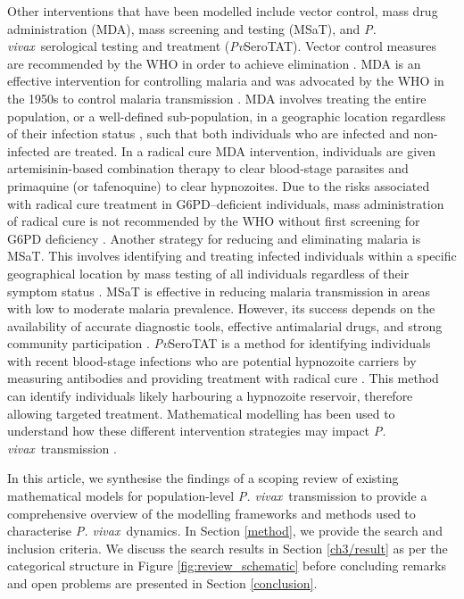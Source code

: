 \documentclass[12pt]{article}
\newcommand{\pv}{\textit{P. vivax}}
\begin{document}
Other interventions that have been modelled include vector control, mass drug administration (MDA), mass screening and testing (MSaT), and \pv~serological testing and treatment (\textit{Pv}SeroTAT). Vector control measures are recommended by the WHO in order to achieve elimination \cite{zuber2018multidrug}.
MDA is an effective intervention for controlling malaria and was advocated by the WHO in the 1950s to control malaria transmission \cite{hsiang2013mass}. MDA involves treating the entire population, or a well-defined sub-population, in a geographic location regardless of their infection status \cite{newby2015review,hsiang2013mass}, such that both individuals who are infected and non-infected are treated. In a radical cure MDA intervention, individuals are given artemisinin-based combination therapy to clear blood-stage parasites and primaquine (or tafenoquine) to clear hypnozoites. Due to the risks associated with radical cure treatment in G6PD–deficient individuals, mass administration of radical cure is not recommended by the WHO without first screening for G6PD deficiency \cite{world2021second,howes2012g6pd, watson2018implications}. Another strategy for reducing and eliminating malaria is MSaT. This involves identifying and treating infected individuals within a specific geographical location by mass testing of all individuals regardless of their symptom status \cite{singh2022mass}. MSaT is effective in reducing malaria transmission in areas with low to moderate malaria prevalence. However, its success depends on the availability of accurate diagnostic tools, effective antimalarial drugs, and strong community participation \cite{world2020world,kim2021systematic}. \textit{Pv}SeroTAT is a method for identifying individuals with recent blood-stage infections who are potential hypnozoite carriers by measuring antibodies and providing treatment with radical cure \cite{obadia2022developing}. This method can identify individuals likely harbouring a hypnozoite reservoir, therefore allowing targeted treatment. Mathematical modelling has been used to understand how these different intervention strategies may impact \pv~transmission \cite{ishikawa2003mathematical,white2018mathematical,aguas2012modeling}.

In this article, we synthesise the findings of a scoping review of existing mathematical models for population-level \pv~transmission to provide a comprehensive overview of the modelling frameworks and methods used to characterise \pv~dynamics. In Section \ref{method}, we provide the search and inclusion criteria. We discuss the search results in Section \ref{ch3/result} as per the categorical structure in Figure \ref{fig:review_schematic} before concluding remarks and open problems are presented in Section \ref{conclusion}.
\end{document}
